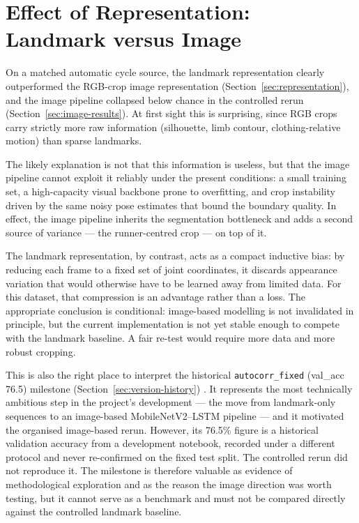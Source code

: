 \section{Effect of Representation: Landmark versus Image}
\label{sec:disc-representation}

On a matched automatic cycle source, the landmark representation clearly
outperformed the RGB-crop image representation
(Section~\ref{sec:representation}), and the image pipeline collapsed below
chance in the controlled rerun (Section~\ref{sec:image-results}). At first
sight this is surprising, since RGB crops carry strictly more raw information
(silhouette, limb contour, clothing-relative motion) than sparse landmarks.

The likely explanation is not that this information is useless, but that the
image pipeline cannot exploit it reliably under the present conditions: a small
training set, a high-capacity visual backbone prone to overfitting, and crop
instability driven by the same noisy pose estimates that bound the boundary
quality. In effect, the image pipeline inherits the segmentation bottleneck and
adds a second source of variance --- the runner-centred crop --- on top of it.

The landmark representation, by contrast, acts as a compact inductive bias:
by reducing each frame to a fixed set of joint coordinates, it discards
appearance variation that would otherwise have to be learned away from limited
data. For this dataset, that compression is an advantage rather than a loss.
The appropriate conclusion is conditional: image-based modelling is not
invalidated in principle, but the current implementation is not yet stable
enough to compete with the landmark baseline. A fair re-test would require more
data and more robust cropping.

This is also the right place to interpret the historical
\texttt{autocorr\_fixed} (val\_acc 76.5) milestone
(Section~\ref{sec:version-history}) . It represents the most technically ambitious
step in the project's development --- the move from landmark-only sequences to
an image-based MobileNetV2--LSTM pipeline --- and it motivated the organised
image-based rerun. However, its 76.5\% figure is a historical validation
accuracy from a development notebook, recorded under a different protocol and
never re-confirmed on the fixed test split. The controlled rerun did not
reproduce it. The milestone is therefore valuable as evidence of methodological
exploration and as the reason the image direction was worth testing, but it
cannot serve as a benchmark and must not be compared directly against the
controlled landmark baseline.

